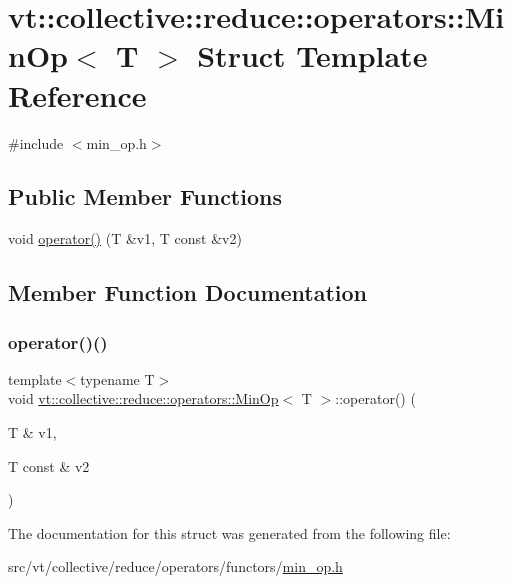\hypertarget{structvt_1_1collective_1_1reduce_1_1operators_1_1_min_op}{}\section{vt\+:\+:collective\+:\+:reduce\+:\+:operators\+:\+:Min\+Op$<$ T $>$ Struct Template Reference}
\label{structvt_1_1collective_1_1reduce_1_1operators_1_1_min_op}


{\ttfamily \#include $<$min\+\_\+op.\+h$>$}

\subsection*{Public Member Functions}
\begin{DoxyCompactItemize}
\item 
void \hyperlink{structvt_1_1collective_1_1reduce_1_1operators_1_1_min_op_a19d2f7cf4443406bdf6ba593e7e23eba}{operator()} (T \&v1, T const \&v2)
\end{DoxyCompactItemize}


\subsection{Member Function Documentation}
\mbox{\label{structvt_1_1collective_1_1reduce_1_1operators_1_1_min_op_a19d2f7cf4443406bdf6ba593e7e23eba}} 
\subsubsection{\texorpdfstring{operator()()}{operator()()}}
{\footnotesize\ttfamily template$<$typename T$>$ \\
void \hyperlink{structvt_1_1collective_1_1reduce_1_1operators_1_1_min_op}{vt\+::collective\+::reduce\+::operators\+::\+Min\+Op}$<$ T $>$\+::operator() (\begin{DoxyParamCaption}\item[{T \&}]{v1,  }\item[{T const \&}]{v2 }\end{DoxyParamCaption})\hspace{0.3cm}{\ttfamily [inline]}}



The documentation for this struct was generated from the following file\+:\begin{DoxyCompactItemize}
\item 
src/vt/collective/reduce/operators/functors/\hyperlink{min__op_8h}{min\+\_\+op.\+h}\end{DoxyCompactItemize}
